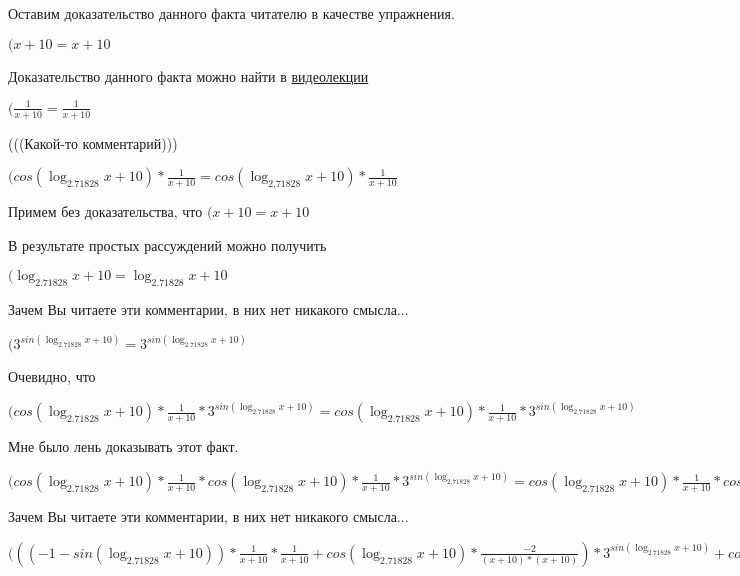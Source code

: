 \documentclass[12pt,a4paper,fleqn]{article}
\theoremstyle{definition}
\begin{document}
Оставим доказательство данного факта читателю в качестве упражнения.

$( x  +  10  =  x  +  10 $

Доказательство данного факта можно найти в \href{https://www.youtube.com/watch?v=dQw4w9WgXcQ}{видеолекции}

$(\frac{ 1 }{ x  +  10 }
 = \frac{ 1 }{ x  +  10 }
$

(((Какой-то комментарий)))

$(cos(\log_{ 2.71828 }{ x  +  10 }) * \frac{ 1 }{ x  +  10 }
 = cos(\log_{ 2.71828 }{ x  +  10 }) * \frac{ 1 }{ x  +  10 }
$

Примем без доказательства, что
$( x  +  10  =  x  +  10 $

В результате простых рассуждений можно получить

$(\log_{ 2.71828 }{ x  +  10 } = \log_{ 2.71828 }{ x  +  10 }$

Зачем Вы читаете эти комментарии, в них нет никакого смысла...

$({ 3 }^{sin(\log_{ 2.71828 }{ x  +  10 })} = { 3 }^{sin(\log_{ 2.71828 }{ x  +  10 })}$

Очевидно, что

$(cos(\log_{ 2.71828 }{ x  +  10 }) * \frac{ 1 }{ x  +  10 }
 * { 3 }^{sin(\log_{ 2.71828 }{ x  +  10 })} = cos(\log_{ 2.71828 }{ x  +  10 }) * \frac{ 1 }{ x  +  10 }
 * { 3 }^{sin(\log_{ 2.71828 }{ x  +  10 })}$

Мне было лень доказывать этот факт.

$(cos(\log_{ 2.71828 }{ x  +  10 }) * \frac{ 1 }{ x  +  10 }
 * cos(\log_{ 2.71828 }{ x  +  10 }) * \frac{ 1 }{ x  +  10 }
 * { 3 }^{sin(\log_{ 2.71828 }{ x  +  10 })} = cos(\log_{ 2.71828 }{ x  +  10 }) * \frac{ 1 }{ x  +  10 }
 * cos(\log_{ 2.71828 }{ x  +  10 }) * \frac{ 1 }{ x  +  10 }
 * { 3 }^{sin(\log_{ 2.71828 }{ x  +  10 })}$

Зачем Вы читаете эти комментарии, в них нет никакого смысла...

$((( -1  - sin(\log_{ 2.71828 }{ x  +  10 })) * \frac{ 1 }{ x  +  10 }
 * \frac{ 1 }{ x  +  10 }
 + cos(\log_{ 2.71828 }{ x  +  10 }) * \frac{ -2 }{( x  +  10 ) * ( x  +  10 )}
) * { 3 }^{sin(\log_{ 2.71828 }{ x  +  10 })} + cos(\log_{ 2.71828 }{ x  +  10 }) * \frac{ 1 }{ x  +  10 }
 * cos(\log_{ 2.71828 }{ x  +  10 }) * \frac{ 1 }{ x  +  10 }
 * { 3 }^{sin(\log_{ 2.71828 }{ x  +  10 })} = (( -1  - sin(\log_{ 2.71828 }{ x  +  10 })) * \frac{ 1 }{ x  +  10 }
 * \frac{ 1 }{ x  +  10 }
 + cos(\log_{ 2.71828 }{ x  +  10 }) * \frac{ -2 }{( x  +  10 ) * ( x  +  10 )}
) * { 3 }^{sin(\log_{ 2.71828 }{ x  +  10 })} + cos(\log_{ 2.71828 }{ x  +  10 }) * \frac{ 1 }{ x  +  10 }
 * cos(\log_{ 2.71828 }{ x  +  10 }) * \frac{ 1 }{ x  +  10 }
 * { 3 }^{sin(\log_{ 2.71828 }{ x  +  10 })}$
\end{document}

